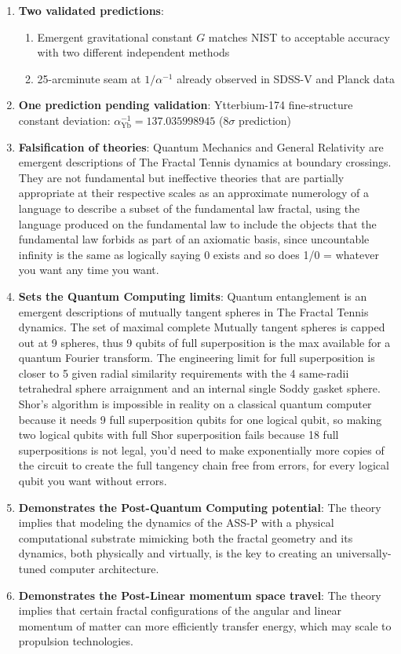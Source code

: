 \documentclass[11pt,a4paper]{article}
\begin{document}
\begin{enumerate}
\item \textbf{Two validated predictions}:
\begin{enumerate}
\item Emergent gravitational constant $G$ matches NIST to acceptable accuracy with two different independent methods
\item 25-arcminute seam at $1/\alpha^{-1}$ already observed in SDSS-V and Planck data
\end{enumerate}

\item \textbf{One prediction pending validation}: Ytterbium-174 fine-structure constant deviation: $\alpha^{-1}_{\mathrm{Yb}} = 137.035998945$ ($8\sigma$ prediction)

\item \textbf{Falsification of theories}: Quantum Mechanics and General Relativity are emergent descriptions of The Fractal Tennis dynamics at boundary crossings. They are not fundamental but ineffective theories that are partially appropriate at their respective scales as an approximate numerology of a language to describe a subset of the fundamental law fractal, using the language produced on the fundamental law to include the objects that the fundamental law forbids as part of an axiomatic basis, since uncountable infinity is the same as logically saying 0 exists and so does 1/0 = whatever you want any time you want.

\item \textbf{Sets the Quantum Computing limits}: Quantum entanglement is an emergent descriptions of mutually tangent spheres in The Fractal Tennis dynamics. The set of maximal complete Mutually tangent spheres is capped out at 9 spheres, thus 9 qubits of full superposition is the max available for a quantum Fourier transform. The engineering limit for full superposition is closer to 5 given radial similarity requirements with the 4 same-radii tetrahedral sphere arraignment and an internal single Soddy gasket sphere. Shor's algorithm is impossible in reality on a classical quantum computer because it needs 9 full superposition qubits for one logical qubit, so making two logical qubits with full Shor superposition fails because 18 full superpositions is not legal, you'd need to make exponentially more copies of the circuit to create the full tangency chain free from errors, for every logical qubit you want without errors.

\item \textbf{Demonstrates the Post-Quantum Computing potential}: The theory implies that modeling the dynamics of the ASS-P with a physical computational substrate mimicking both the fractal geometry and its dynamics, both physically and virtually, is the key to creating an universally-tuned computer architecture.


\item \textbf{Demonstrates the Post-Linear momentum space travel}: The theory implies that certain fractal configurations of the angular and linear momentum of matter can more efficiently transfer energy, which may scale to propulsion technologies. 

\end{enumerate}
\end{document}
